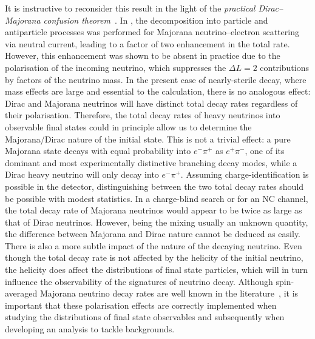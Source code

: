 It is instructive to reconsider this result in the light of the %
\emph{practical Dirac--Majorana confusion theorem}~\cite{Kayser:1981nw, Kayser:1982br}.
In , the decomposition into particle and antiparticle processes was performed for %
Majorana neutrino--electron scattering via neutral current, leading to a factor of two enhancement in the total rate.
However, this enhancement was shown to be absent in practice due to the polarisation of the incoming neutrino, %
which suppresses the $\Delta L = 2$ contributions by factors of the neutrino mass. 
In the present case of nearly-sterile decay, where mass effects are large and essential to the calculation, %
there is no analogous effect: Dirac and Majorana neutrinos will have distinct total decay rates regardless of their polarisation. 
Therefore, the total decay rates of heavy neutrinos into observable final states could in principle allow us to determine %
the Majorana/Dirac nature of the initial state.
This is not a trivial effect: a pure Majorana state decays with equal probability into $e^-\pi^+$ as $e^+ \pi^-$, %
one of its dominant and most experimentally distinctive branching decay modes, while a Dirac heavy neutrino %
will only decay into $e^-\pi^+$.
%
Assuming charge-identification is possible in the detector, distinguishing between the two total decay rates %
should be possible with modest statistics. %
In a charge-blind search or for an NC channel, the total decay rate of Majorana neutrinos would appear %
to be twice as large as that of Dirac neutrinos.
However, being the mixing usually an unknown quantity, the difference between Majorana and Dirac nature cannot be deduced as easily.
There is also a more subtle impact of the nature of the decaying neutrino.
Even though the total decay rate is not affected by the helicity of the initial neutrino, %
the helicity does affect the distributions of final state particles, which will in turn influence the observability of %
the signatures of neutrino decay. 
Although spin-averaged Majorana neutrino decay rates are well known in the %
literature~\cite{Atre:2009rg,Gorbunov:2007ak,Helo:2010cw,Bondarenko:2018ptm}, %
it is important that these polarisation effects are correctly implemented when studying the distributions of %
final state observables and subsequently when developing an analysis to tackle backgrounds. 

